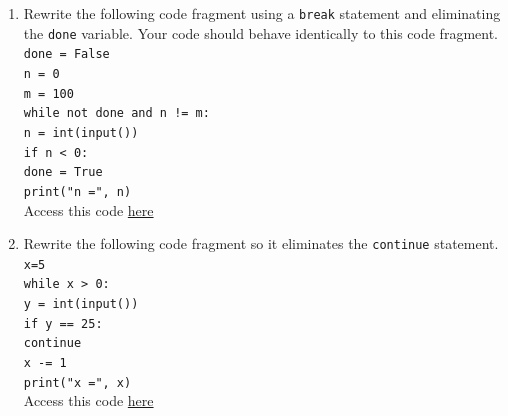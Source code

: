 \documentclass{article}
\begin{document}
\begin{enumerate}
	\item Rewrite the following code fragment using a \texttt{break} statement and eliminating the \texttt{done} variable. Your code should behave identically to this code fragment.\\ \texttt{done = False}\\
	\texttt{n = 0}\\
	\texttt{m = 100}\\
	\texttt{while not done and n != m:}\\
	\null\quad\texttt{n = int(input())}\\
	\null\quad\texttt{if n < 0:}\\
	\null\quad\quad\texttt{done = True}\\
	\null\quad\quad\texttt{print("n =", n)}\\
	Access this code \href{https://drive.google.com/file/d/1KwygTfKY4ElVcE4FWrkCUfiXhfs8mJgo/view?usp=sharing}{here}
	\item 
	Rewrite the following code fragment so it eliminates the \texttt{continue} statement.\\
	\texttt{x=5}\\
	\texttt{while x > 0:}\\
	\null\quad\texttt{y = int(input())}\\
	\null\quad\texttt{if y == 25:}\\
	\null\quad\quad\texttt{continue}\\
	\null\quad\texttt{x -= 1}\\
	\null\quad\texttt{print("x =", x)}\\
	Access this code
\href{https://drive.google.com/file/d/1_4lXimn7miTlqGtOP2JLUAhIumLbPkRN/view?usp=sharing}{here}
\end{enumerate}
\end{document}
